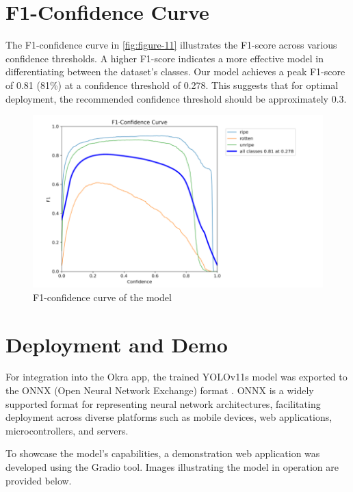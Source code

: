 {\section{F1-Confidence Curve}
The F1-confidence curve in \autoref{fig:figure-11} illustrates the F1-score across various confidence thresholds. A higher F1-score indicates a more effective model in differentiating between the dataset's classes. Our model achieves a peak F1-score of 0.81 (81\%) at a confidence threshold of 0.278. This suggests that for optimal deployment, the recommended confidence threshold should be approximately 0.3.

    \begin{figure}[H]
    \centering
    \includegraphics[scale=0.8]{Figures/fi_conf.png}
    \caption{F1-confidence curve of the model}
    \label{fig:figure-11}
\end{figure}


\section{Deployment and Demo}
For integration into the Okra app, the trained YOLOv11s model was exported to the ONNX (Open Neural Network Exchange) format \citep{onnx}. ONNX is a widely supported format for representing neural network architectures, facilitating deployment across diverse platforms such as mobile devices, web applications, microcontrollers, and servers.
\vspace{\myvspace}

To showcase the model's capabilities, a demonstration web application was developed using the Gradio tool. Images illustrating the model in operation are provided below.



}
